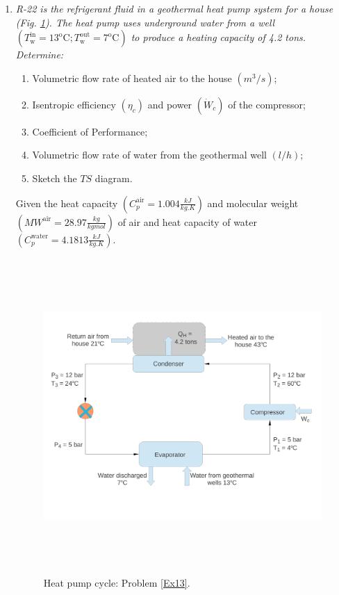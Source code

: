 \begin{enumerate}
\item \label{Ex13} {\it R-22 is the refrigerant fluid in a geothermal heat pump system for a house (Fig. \ref{Ex13:Fig}). The heat pump uses underground water from a well $\left(T_{\text{w}}^{\text{in}}=13^{\text{o}}\text{C}; T_{\text{w}}^{\text{out}}=7^{\text{o}}\text{C}\right)$ to produce a heating capacity of 4.2 tons. Determine:
\begin{enumerate}
 \item Volumetric flow rate of heated air to the house $\left(m^{3}/s\right)$;
 \item Isentropic efficiency $\left(\eta_{c}\right)$ and power $\left(\dot{W}_{c}\right)$ of the compressor;
 \item Coefficient of Performance;
 \item Volumetric flow rate of water from the geothermal well $\left(l/h\right)$;
 \item Sketch the $TS$ diagram.
\end{enumerate}
Given the heat capacity $\left(C_{p}^{\text{air}}=1.004\displaystyle\frac{kJ}{kg.K}\right)$ and molecular weight $\left(MW^{\text{air}}=28.97\displaystyle\frac{kg}{kgmol}\right)$ of air and heat capacity of water $\left(C_{p}^{\text{water}}=4.1813\displaystyle\frac{kJ}{kg.K}\right)$.
}

\begin{figure}[h]
\begin{center}
\includegraphics[width=16.0cm,height=12.0cm]{./Pics/Overview_Refrig42}
\end{center}
\caption{Heat pump cycle: Problem \ref{Ex13}.}\label{Ex13:Fig}
\end{figure}



\end{enumerate}
